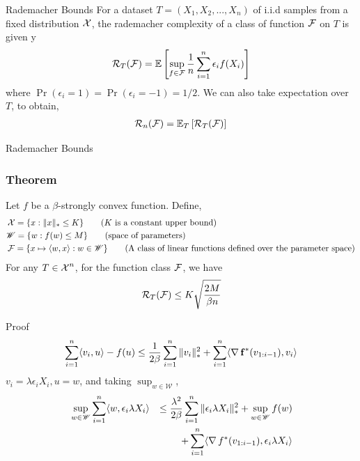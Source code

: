 \begin{frame}{Rademacher Bounds}
  For a dataset $T=(X_1,X_2,...,X_n)$ of i.i.d samples from a fixed distribution $\operatorname{\mathcal{X}}$, the rademacher complexity of a class of function $\operatorname{\mathcal{F}}$ on $T$ is given y
  \begin{align*}
    \operatorname{\mathcal{R}}_T(\operatorname{\mathcal{F}}) = \operatorname{\mathbb{E}} \left[ \sup_{f \in \operatorname{\mathcal{F}}} \frac{1}{n}\sum_{i=1}^n \epsilon_i f(X_i) \right]
  \end{align*}
  where $\Pr(\epsilon_i = 1) = \Pr(\epsilon_i = -1) = 1/2$.
  We can also take expectation over $T$, to obtain,
  \begin{align*}
    \operatorname{\mathcal{R}}_n(\operatorname{\mathcal{F}})=\operatorname{\mathbb{E}}_{T}\left[\operatorname{\mathcal{R}}_T(\operatorname{\mathcal{F}})\right]
  \end{align*}
\end{frame}

\begin{frame}{Rademacher Bounds}
    \frametitle{Theorem}
    Let $f$ be a $\beta$-strongly convex function. Define,
    \begin{align*}
      & \operatorname{\mathcal{X}} = \{ x : \|x\|_{*} \le K \} \tag{$K$ is a constant upper bound}\\
      & \mathscr{W} = \{w : f(w) \le M\} \tag{space of parameters}\\
      & \operatorname{\mathcal{F}} = \{ x \mapsto \langle {w} , {x} \rangle : w \in \mathscr{W} \} \tag{A class of linear functions defined over the parameter space}
    \end{align*}
    For any $T \in \operatorname{\mathcal{X}}^n$, for the function class $\operatorname{\mathcal{F}}$, we have
    \begin{align*}
      & \operatorname{\mathcal{R}}_T(\operatorname{\mathcal{F}}) \le K\sqrt{\frac{2M}{\beta n}} \\
    \end{align*}
\end{frame}

\begin{frame}{Proof}
    \begin{align*}
      \sum_{i=1}^n \langle {v_i} , {u} \rangle - f(u) \le \frac{1}{2\beta} \sum_{i=1}^n \|v_i\|_{*}^2 + \sum_{i=1}^n \langle {\operatorname{\nabla}{\operatorname{\mathbf{f}}}^{*}(v_{1:i-1})} , {v_i} \rangle
    \end{align*}
    $v_i=\lambda\epsilon_i X_i,u=w$, and taking $\sup_{w \in \mathscr{W}}$,
    \begin{alignat*}{2}
      & \sup_{w \in \mathscr{W}} \sum_{i=1}^n \langle {w} , {\epsilon_i \lambda X_i} \rangle & \le \frac{\lambda^2}{2\beta}\sum_{i=1}^n \|\epsilon_i \lambda X_i\|_{*}^2 + \sup_{w \in \mathscr{W}} f(w) \\
      & & + \sum_{i=1}^n \langle {\operatorname{\nabla}{f}^{*}(v_{1:i-1})} , {\epsilon_i \lambda X_i} \rangle
    \end{alignat*}
\end{frame}

